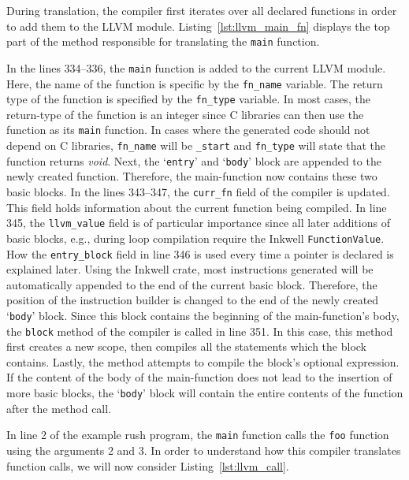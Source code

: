 During translation, the compiler first iterates over all declared functions in order to add them to the LLVM module.
Listing~\ref{lst:llvm_main_fn} displays the top part of the method responsible for translating the \texttt{main} function.


In the lines 334--336, the \texttt{main} function is added to the current LLVM module.
Here, the name of the function is specific by the \texttt{fn\_name} variable.
The return type of the function is specified by the \texttt{fn\_type} variable.
In most cases, the return-type of the function is an integer since C libraries can then use the function as its \texttt{main} function.
In cases where the generated code should not depend on C libraries, \Verb|fn_name| will be \Verb|_start| and \Verb|fn_type| will state that the function returns \emph{void}.
Next, the `\texttt{entry}' and `\texttt{body}' block are appended to the newly created function.
Therefore, the main-function now contains these two basic blocks.
In the lines 343--347, the \Verb|curr_fn| field of the compiler is updated.
This field holds information about the current function being compiled.
In line 345, the \Verb|llvm_value| field is of particular importance since all later additions of basic blocks, e.g., during loop compilation require the Inkwell \texttt{FunctionValue}.
How the \Verb|entry_block| field in line 346 is used every time a pointer is declared is explained later.
Using the Inkwell crate, most instructions generated will be automatically appended to the end of the current basic block.
Therefore, the position of the instruction builder is changed to the end of the newly created `\texttt{body}' block.
Since this block contains the beginning of the main-function's body, the \texttt{block} method of the compiler is called in line 351.
In this case, this method first creates a new scope, then compiles all the statements which the block contains.
Lastly, the method attempts to compile the block's optional expression.
If the content of the body of the main-function does not lead to the insertion of more basic blocks,
the `\texttt{body}' block will contain the entire contents of the function after the method call.

In line 2 of the example rush program, the \texttt{main} function calls the \texttt{foo} function using the arguments 2 and 3.
In order to understand how this compiler translates function calls, we will now consider Listing~\ref{lst:llvm_call}.

